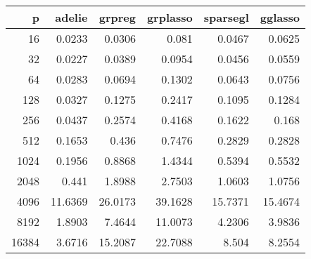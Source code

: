 \begin{tabular}{rrrrrr}
\hline
     p &   adelie &   grpreg &   grplasso &   sparsegl &   gglasso \\
\hline
    16 &      0.0233 &   0.0306 &     0.081  &     0.0467 &    0.0625 \\
    32 &      0.0227 &   0.0389 &     0.0954 &     0.0456 &    0.0559 \\
    64 &      0.0283 &   0.0694 &     0.1302 &     0.0643 &    0.0756 \\
   128 &      0.0327 &   0.1275 &     0.2417 &     0.1095 &    0.1284 \\
   256 &      0.0437 &   0.2574 &     0.4168 &     0.1622 &    0.168  \\
   512 &      0.1653 &   0.436  &     0.7476 &     0.2829 &    0.2828 \\
  1024 &      0.1956 &   0.8868 &     1.4344 &     0.5394 &    0.5532 \\
  2048 &      0.441  &   1.8988 &     2.7503 &     1.0603 &    1.0756 \\
  4096 &     11.6369 &  26.0173 &    39.1628 &    15.7371 &   15.4674 \\
  8192 &      1.8903 &   7.4644 &    11.0073 &     4.2306 &    3.9836 \\
 16384 &      3.6716 &  15.2087 &    22.7088 &     8.504  &    8.2554 \\
\hline
\end{tabular}